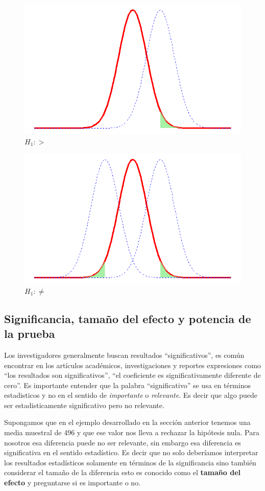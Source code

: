 \documentclass[]{book}
\begin{document}
\begin{figure}[h]

{\centering \includegraphics[width=0.5\linewidth]{phmore} 

}

\caption{$H_1:>$}\label{fig:phmore}
\end{figure}

\begin{figure}[h]

{\centering \includegraphics[width=0.5\linewidth]{ph2c} 

}

\caption{$H_1:\neq$}\label{fig:ph2c}
\end{figure}

\hypertarget{significancia-tamano-del-efecto-y-potencia-de-la-prueba}{%
\subsection{Significancia, tamaño del efecto y potencia de la prueba}\label{significancia-tamano-del-efecto-y-potencia-de-la-prueba}}

Los investigadores generalmente buscan resultados ``significativos'', es común encontrar en los artículos académicos, investigaciones y reportes expresiones como ``los resultados son significativos'', ``el coeficiente es significativamente diferente de cero''. Es importante entender que la palabra ``significativo'' se usa en términos estadisticos y no en el sentido de \emph{importante} o \emph{relevante}. Es decir que algo puede ser estadisticamente significativo pero no relevante.

Supongamos que en el ejemplo desarrollado en la sección anterior tenemos una media muestral de 496 y que ese valor nos lleva a rechazar la hipótesis nula. Para nosotros esa diferencia puede no ser relevante, sin embargo esa diferencia es significativa en el sentido estadístico. Es decir que no solo deberíamos interpretar los resultados estadísticos solamente en términos de la significancia sino también considerar el tamaño de la diferencia esto es conocido como el \textbf{tamaño del efecto} y preguntarse si es importante o no.
\end{document}
